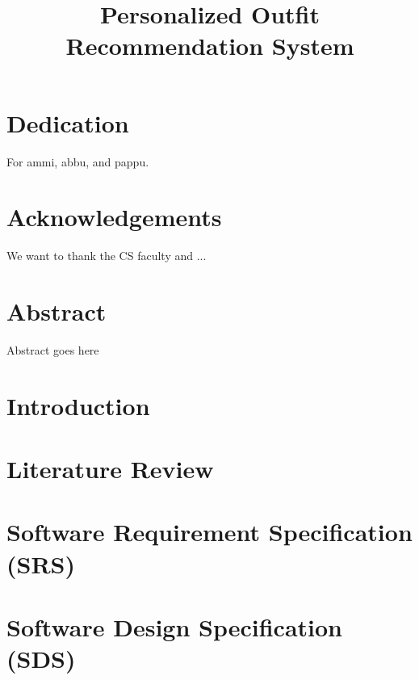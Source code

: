 \documentclass[12pt]{report}
\title{Personalized Outfit Recommendation System}
\begin{document}

\chapter*{Dedication}
For ammi, abbu, and pappu.

\chapter*{Acknowledgements}
We want to thank the CS faculty and ...

\chapter*{Abstract}
Abstract goes here

\tableofcontents
\listoffigures
\listoftables


\chapter{Introduction}
\label{chap:intro}


\chapter{Literature Review}
\label{chap:lit}


\chapter{Software Requirement Specification (SRS)}
\label{chap:srs}


\chapter{Software Design Specification (SDS)}
\label{chap:sds}

\end{document}
